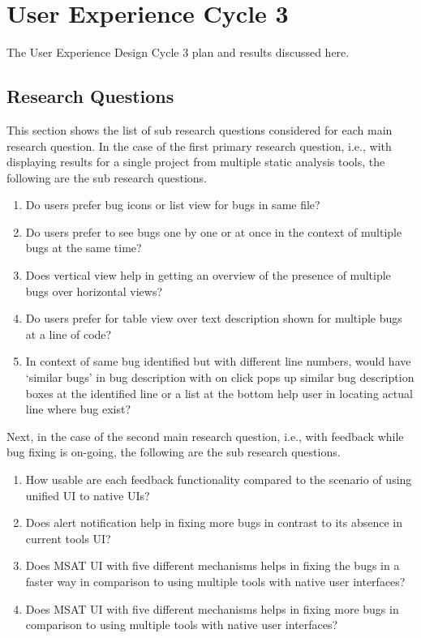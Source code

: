 \chapter{User Experience Cycle 3}
\label{ch:ux3-cycle_report}

The User Experience Design Cycle 3 plan and results discussed here. \\

\section{Research Questions}

This section shows the list of sub research questions considered for each main research question. In the case of the first primary research question, i.e., with displaying results for a single project from multiple static analysis tools, the following are the sub research questions. \\

\begin{enumerate}
\item Do users prefer bug icons or list view for bugs in same file?
\item Do users prefer to see bugs one by one or at once in the context of multiple bugs at the same time?
\item Does vertical view help in getting an overview of the presence of multiple bugs over horizontal views?
\item Do users prefer for table view over text description shown for multiple bugs at a line of code?
\item In context of same bug identified but with different line numbers, would have ‘similar bugs’ in bug description with on click pops up similar bug description boxes at the identified line or a list at the bottom help user in locating actual line where bug exist?
\end{enumerate}

Next, in the case of the second main research question, i.e., with feedback while bug fixing is on-going, the following are the sub research questions. \\

\begin{enumerate}
\item How usable are each feedback functionality compared to the scenario of using unified UI to native UIs?
\item Does alert notification help in fixing more bugs in contrast to its absence in current tools UI?
\item Does MSAT UI with five different mechanisms helps in fixing the bugs in a faster way in comparison to using multiple tools with native user interfaces?
\item Does MSAT UI with five different mechanisms helps in fixing more bugs in comparison to using multiple tools with native user interfaces?
\end{enumerate}

